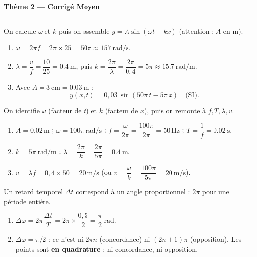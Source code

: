 \documentclass[11pt,a4paper]{article}
\begin{document}
\begin{center}
{\large\bfseries\color{excol} Thème 2 — Corrigé Moyen}\\[-2pt]
{\color{excol}\rule{5cm}{1pt}}
\end{center}

\begin{corrige}
On calcule $\omega$ et $k$ puis on assemble $y=A\sin(\omega t - kx)$ (attention : $A$ en \si{\metre}).
\begin{enumerate}[label=\alph*)]
  \item $\omega=2\pi f=2\pi\times 25=50\pi\approx\SI{157}{\radian\per\second}.$
  \item $\lambda=\dfrac{v}{f}=\dfrac{10}{25}=\SI{0.4}{\metre}$, puis
        $k=\dfrac{2\pi}{\lambda}=\dfrac{2\pi}{0{,}4}=5\pi\approx\SI{15.7}{\radian\per\metre}.$
  \item Avec $A=\SI{3}{\centi\metre}=\SI{0.03}{\metre}$ :
        \[ y(x,t)=0{,}03\,\sin\!\left(50\pi\,t - 5\pi\,x\right)\quad\text{(SI)}. \]
\end{enumerate}
\end{corrige}

\begin{corrige}
On identifie $\omega$ (facteur de $t$) et $k$ (facteur de $x$), puis on remonte à $f,T,\lambda,v$.
\begin{enumerate}[label=\alph*)]
  \item $A=\SI{0.02}{\metre}$ ; $\omega=100\pi\ \si{\radian\per\second}$ ;
        $f=\dfrac{\omega}{2\pi}=\dfrac{100\pi}{2\pi}=\SI{50}{\hertz}$ ;
        $T=\dfrac{1}{f}=\SI{0.02}{\second}.$
  \item $k=5\pi\ \si{\radian\per\metre}$ ;
        $\lambda=\dfrac{2\pi}{k}=\dfrac{2\pi}{5\pi}=\SI{0.4}{\metre}.$
  \item $v=\lambda f=0{,}4\times 50=\SI{20}{\metre\per\second}$
        (ou $v=\dfrac{\omega}{k}=\dfrac{100\pi}{5\pi}=\SI{20}{\metre\per\second}$).
\end{enumerate}
\end{corrige}

\begin{corrige}
Un retard temporel $\Delta t$ correspond à un angle proportionnel : $2\pi$ pour une période entière.
\begin{enumerate}[label=\alph*)]
  \item $\Delta\varphi=2\pi\,\dfrac{\Delta t}{T}=2\pi\times\dfrac{0{,}5}{2}=\dfrac{\pi}{2}\ \si{\radian}.$
  \item $\Delta\varphi=\pi/2$ : ce n'est ni $2\pi n$ (concordance) ni $(2n+1)\pi$ (opposition).
        Les points sont \textbf{en quadrature} : ni concordance, ni opposition.
\end{enumerate}
\end{corrige}
\end{document}
